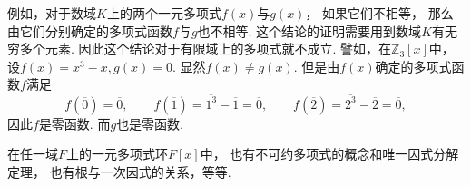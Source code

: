 例如，对于数域\(K\)上的两个一元多项式\(f(x)\)与\(g(x)\)，
如果它们不相等，
那么由它们分别确定的多项式函数\(f\)与\(g\)也不相等.
这个结论的证明需要用到数域\(K\)有无穷多个元素.
因此这个结论对于有限域上的多项式就不成立.
譬如，在\(\mathbb{Z}_3[x]\)中，
设\(f(x)=x^3-x,
g(x)=0\).
显然\(f(x) \neq g(x)\).
但是由\(f(x)\)确定的多项式函数\(f\)满足\begin{equation*}
	f(\overline0)=\overline0, \qquad
	f(\overline1)=\overline{1^3}-\overline1=\overline0, \qquad
	f(\overline2)=\overline{2^3}-\overline2=\overline0,
\end{equation*}
因此\(f\)是零函数.
而\(g\)也是零函数.

在任一域\(F\)上的一元多项式环\(F[x]\)中，
也有不可约多项式的概念和唯一因式分解定理，
也有根与一次因式的关系，等等.
